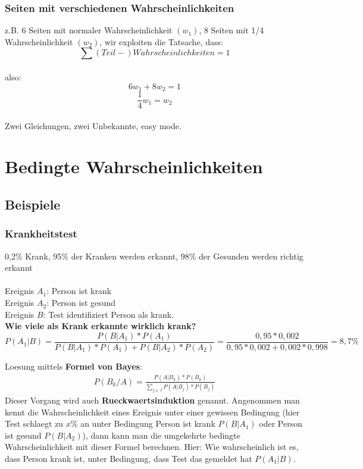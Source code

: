 \documentclass{article}
\begin{document}
\subsubsection{Seiten mit verschiedenen Wahrscheinlichkeiten}
z.B. 6 Seiten mit normaler Wahrscheinlichkeit $(w_1)$, 8 Seiten mit 1/4 Wahrscheinlichkeit
$(w_2)$, wir exploiten die Tatsache, dass: \\ \[ \sum
(Teil-)Wahrscheinlichkeiten = 1 \]\\
also:\\
\begin{equation}	
6w_1 + 8w_2 = 1 \end{equation}
\begin{equation}	
	\frac{1}{4}w_1 = w_2 
\end{equation}\\
Zwei Gleichungen, zwei Unbekannte, easy mode.

\section{Bedingte Wahrscheinlichkeiten}
\subsection{Beispiele}
\subsubsection{Krankheitstest}
0,2\% Krank, 95\% der Kranken werden erkannt, 98\% der Gesunden werden richtig erkannt\\ \\
Ereignis $A_1$: Person ist krank\\
Ereignis $A_2$: Person ist gesund\\
Ereignis $B$: Test identifiziert Person als krank.\\

\textbf{Wie viele als Krank erkannte wirklich krank?}\\
\[
	P(A_1 | B ) = \frac{P(B|A_1)*P(A_1)}
	{P(B|A_1)*P(A_1)+P(B| A_2)*P(A_2)} =
	\frac{0,95*0,002}{0,95*0,002+0,002*0,998} = 8,7\%
\]

\vspace*{10pt}

Loesung mittels \textbf{Formel von Bayes}:
\begin{align}
	P(B_k/A) = \frac{P(A|B_k) * P(B_k)}{\sum_{j \in J} P(A|B_j) * P(B_j)}
\end{align}
Dieser Vorgang wird auch \textbf{Rueckwaertsinduktion} genannt. Angenommen man
kennt die Wahrscheinlichkeit eines Ereignis unter einer gewissen Bedingung (hier Test
schlaegt zu $x\%$ an unter Bedingung Person ist krank $P(B|A_1)$ oder Person ist gesund
$P(B|A_2)$), dann kann man die umgekehrte bedingte Wahrscheinlichkeit
mit dieser Formel berechnen. Hier: Wie wahrscheinlich ist es, dass Person krank ist, unter
Bedingung, dass Test das gemeldet hat $P(A_1|B)$.
\end{document}
